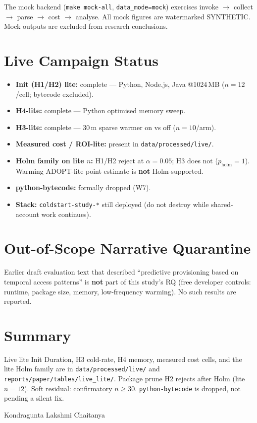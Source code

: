 The mock backend (\texttt{make mock-all}, \texttt{data\_mode=mock}) exercises invoke
$\rightarrow$ collect $\rightarrow$ parse $\rightarrow$ cost $\rightarrow$ analyse. All mock
figures are watermarked SYNTHETIC. Mock outputs are excluded from research conclusions.

\section{Live Campaign Status}
\label{sec:eval_live_residual}

\begin{itemize}
    \item \textbf{Init (H1/H2) lite:} complete --- Python, Node.js, Java @1024\,MB
      ($n{=}12$/cell; bytecode excluded).
    \item \textbf{H4-lite:} complete --- Python optimised memory sweep.
    \item \textbf{H3-lite:} complete --- 30\,m sparse warmer on vs off ($n{=}10$/arm).
    \item \textbf{Measured cost / ROI-lite:} present in \texttt{data/processed/live/}.
    \item \textbf{Holm family on lite $n$:} H1/H2 reject at $\alpha{=}0.05$; H3 does not
      ($p_{\mathrm{holm}}=1$). Warming ADOPT-lite point estimate is \textbf{not} Holm-supported.
    \item \textbf{python-bytecode:} formally dropped (W7).
    \item \textbf{Stack:} \texttt{coldstart-study-*} still deployed (do not destroy while
      shared-account work continues).
\end{itemize}

\section{Out-of-Scope Narrative Quarantine}

Earlier draft evaluation text that described ``predictive provisioning based on temporal
access patterns'' is \textbf{not} part of this study's RQ (free developer controls:
runtime, package size, memory, low-frequency warming). No such results are reported.

\section{Summary}

Live lite Init Duration, H3 cold-rate, H4 memory, measured cost cells, and the lite Holm
family are in \texttt{data/processed/live/} and \texttt{reports/paper/tables/live\_lite/}.
Package prune H2 rejects after Holm (lite $n{=}12$). Soft residual: confirmatory $n{\ge}30$.
\texttt{python-bytecode} is dropped, not pending a silent fix.

Kondragunta Lakshmi Chaitanya

